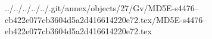 ../../../../../.git/annex/objects/27/Gv/MD5E-s4476--eb422e077cb3604d5a2d416614220e72.tex/MD5E-s4476--eb422e077cb3604d5a2d416614220e72.tex